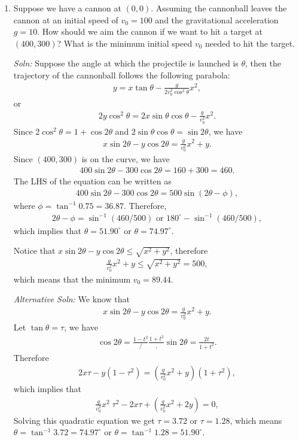 \documentclass{article}
\begin{document}
\begin{enumerate}
\item  Suppose we have a cannon at $(0,0)$. Assuming the cannonball leaves the cannon at an initial speed of $v_0=100$ and the gravitational acceleration $g = 10$. How should we aim the cannon if we want to hit a target at $(400,300)$? What is the minimum initial speed $v_0$ needed to hit the target. 

  \emph{Soln:} Suppose the angle at which the projectile is launched is $\theta$, then the trajectory of the cannonball follows the following parabola:
  \begin{align*}
    y = x\tan \theta  - \frac{g}{2v_0^2\cos^2\theta}x^2,
  \end{align*}
  or
  \begin{align*}
    2y\cos^2\theta = 2x\sin \theta\cos\theta - \frac{g}{v_0^2} x^2.
  \end{align*}
  Since $2\cos^2\theta = 1+\cos 2\theta$ and $2\sin\theta\cos\theta = \sin 2\theta$, we have
  \begin{align*}
    x \sin 2\theta - y\cos 2\theta = \frac{g}{v_0^2}x^2 + y.
  \end{align*}
  Since $(400,300)$ is on the curve, we have
  \begin{align*}
    400 \sin 2\theta - 300\cos 2\theta = 160 + 300 = 460.
  \end{align*}
  The LHS of the equation can be written as
  \begin{align*}
     400 \sin 2\theta - 300\cos 2\theta = 500 \sin(2\theta - \phi),
  \end{align*}
  where $\phi = \tan^{-1}0.75=36.87$. Therefore,
  \begin{align*}
    2\theta-\phi =\sin^{-1}(460/500)\text{ or }180^\circ-\sin^{-1}(460/500),
  \end{align*}
which implies that $\theta = 51.90^\circ$ or $\theta = 74.97^\circ$.

Notice that $x\sin 2\theta - y \cos 2\theta \leq \sqrt{x^2+y^2}$, therefore
\begin{align*}
 \frac{g}{v_0^2}x^2 + y \leq \sqrt{x^2+y^2} = 500, 
\end{align*}
which means that the minimum $v_0 = 89.44$.

\emph{Alternative Soln:} We know that
\begin{align*}
    x \sin 2\theta - y\cos 2\theta = \frac{g}{v_0^2}x^2 + y.
\end{align*}
Let $\tan \theta = \tau$, we have
\begin{align*}
  \cos 2\theta = \frac{1-t^2}/\frac{1+t^2}, \sin 2\theta = \frac{2t}{1+t^2}.
\end{align*}
Therefore
\begin{align*}
 2x \tau - y(1-\tau^2) = \left(\frac{g}{v_0^2}x^2+y\right) (1+\tau^2),
\end{align*}
which implies that
\begin{align*}
  \frac{g}{v_0^2}x^2\; \tau^2 -2x\tau + \left(\frac{g}{v_0^2}x^2+2y\right) = 0,
\end{align*}
Solving this quadratic equation we get $\tau = 3.72$ or $\tau = 1.28$, which means $\theta = \tan^{-1} 3.72 = 74.97^\circ$ or $\theta = \tan^{-1}1.28 = 51.90^\circ$.


\end{enumerate}
\end{document}
